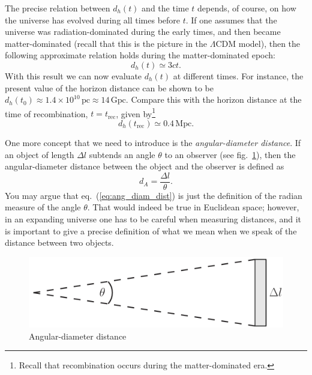 The precise relation between $d_h(t)$ and the time $t$ depends, of course, on how the universe has evolved during all times before $t$. If one assumes that the universe was radiation-dominated during the early times, and then became matter-dominated (recall that this is the picture in the $\Lambda$CDM model), then the following approximate relation holds during the matter-dominated epoch:
\begin{equation} \label{eq:horizon_dist_matter}
d_h(t)\simeq 3ct.
\end{equation}
With this result we can now evaluate $d_h(t)$ at different times. For instance, the present value of the horizon distance can be shown to be $d_h(t_0)\approx 1.4\times10^{10}\,{\mathrm{pc}}\approx14\,{\mathrm{Gpc}}$. Compare this with the horizon distance at the time of recombination, $t=t_{\mathrm{rec}}$, given by\footnote{Recall that recombination occurs during the matter-dominated era.}
\begin{equation}
d_h(t_{\mathrm{rec}})\simeq 0.4\,{\mathrm{Mpc}}.
\end{equation}

One more concept that we need to introduce is the {\it angular-diameter distance}. If an object of length $\Delta l$ subtends an angle $\theta$ to an observer (see fig.\ \ref{fig:lec12_3}), then the angular-diameter distance between the object and the observer is defined as
\begin{equation} \label{eq:ang_diam_dist}
d_A=\frac{\Delta l}{\theta}.
\end{equation}
You may argue that eq.\ (\ref{eq:ang_diam_dist}) is just the definition of the radian measure of the angle $\theta$. That would indeed be true in Euclidean space; however, in an expanding universe one has to be careful when measuring distances, and it is important to give a precise definition of what we mean when we speak of the distance between two objects.
\begin{figure}[ht]
\begin{center}
\includegraphics[scale=0.3]{Draw/lec12_3.png}
\end{center}
\caption{Angular-diameter distance}
\label{fig:lec12_3}
\end{figure}

